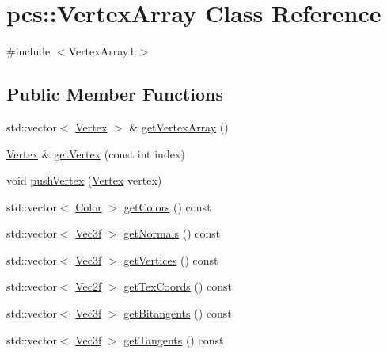 \hypertarget{classpcs_1_1VertexArray}{}\section{pcs\+:\+:Vertex\+Array Class Reference}
\label{classpcs_1_1VertexArray}


{\ttfamily \#include $<$Vertex\+Array.\+h$>$}

\subsection*{Public Member Functions}
\begin{DoxyCompactItemize}
\item 
std\+::vector$<$ \hyperlink{structpcs_1_1Vertex}{Vertex} $>$ \& \hyperlink{classpcs_1_1VertexArray_aba4fafe480a696e9cb577a3e37a493cd}{get\+Vertex\+Array} ()
\item 
\hyperlink{structpcs_1_1Vertex}{Vertex} \& \hyperlink{classpcs_1_1VertexArray_a1f81b5e5e7c5b56ffdb68d75bf7c9b21}{get\+Vertex} (const int index)
\item 
void \hyperlink{classpcs_1_1VertexArray_aa9f8961e54d0ca51383f1f48901b8aaa}{push\+Vertex} (\hyperlink{structpcs_1_1Vertex}{Vertex} vertex)
\item 
std\+::vector$<$ \hyperlink{structpcs_1_1Color}{Color} $>$ \hyperlink{classpcs_1_1VertexArray_a708093524bc0b0945921bbb01bfad240}{get\+Colors} () const
\item 
std\+::vector$<$ \hyperlink{namespacepcs_a68e0f517680976c17c810ffe6952cbab}{Vec3f} $>$ \hyperlink{classpcs_1_1VertexArray_ad5e13c4373166f946de12eefc32d9b7d}{get\+Normals} () const
\item 
std\+::vector$<$ \hyperlink{namespacepcs_a68e0f517680976c17c810ffe6952cbab}{Vec3f} $>$ \hyperlink{classpcs_1_1VertexArray_a8276eeb2939477947ed8a08db788f129}{get\+Vertices} () const
\item 
std\+::vector$<$ \hyperlink{namespacepcs_a4b2fd718bd0800b6aa492b1c60f19edc}{Vec2f} $>$ \hyperlink{classpcs_1_1VertexArray_aecbfa6183ef209e5add9a0ce0f6b2a92}{get\+Tex\+Coords} () const
\item 
std\+::vector$<$ \hyperlink{namespacepcs_a68e0f517680976c17c810ffe6952cbab}{Vec3f} $>$ \hyperlink{classpcs_1_1VertexArray_a296150341ec150fffb88c7611caab4a3}{get\+Bitangents} () const
\item 
std\+::vector$<$ \hyperlink{namespacepcs_a68e0f517680976c17c810ffe6952cbab}{Vec3f} $>$ \hyperlink{classpcs_1_1VertexArray_a8c12ef954189ff654c03c7c530044366}{get\+Tangents} () const
\end{DoxyCompactItemize}
